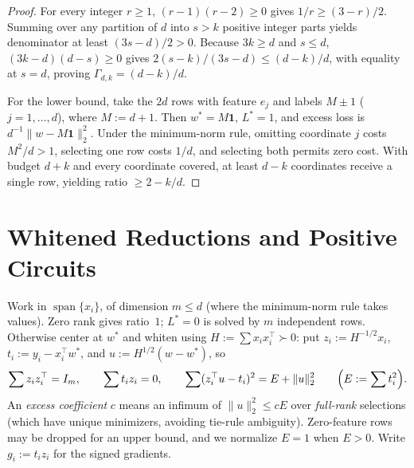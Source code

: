 \documentclass[11pt]{article}
\theoremstyle{plain}
\theoremstyle{definition}
\theoremstyle{remark}
\DeclareMathOperator{\spn}{span}
\begin{document}
\begin{proof}
For every integer $r \ge 1$, $(r - 1)(r - 2) \ge 0$ gives $1/r \ge (3 - r)/2$.
Summing over any partition of $d$ into $s > k$ positive integer parts yields denominator at least $(3s - d)/2 > 0$.
Because $3k \ge d$ and $s \le d$, $(3k - d)(d - s) \ge 0$ gives $2(s - k)/(3s - d) \le (d - k)/d$, with equality at $s = d$, proving $\Gamma_{d, k} = (d - k)/d$.

For the lower bound, take the $2d$ rows with feature $e_j$ and labels $M \pm 1$ ($j = 1, \dots, d$), where $M := d + 1$.
Then $w^* = M\mathbf{1}$, $L^* = 1$, and excess loss is $d^{-1}\|w - M\mathbf{1}\|_2^2$.
Under the minimum-norm rule, omitting coordinate $j$ costs $M^2/d > 1$, selecting one row costs $1/d$, and selecting both permits zero cost.
With budget $d + k$ and every coordinate covered, at least $d - k$ coordinates receive a single row, yielding ratio $\ge 2 - k/d$.
\end{proof}

\section{Whitened Reductions and Positive Circuits}

Work in $\spn\{x_i\}$, of dimension $m \le d$ (where the minimum-norm rule takes values).
Zero rank gives ratio~$1$; $L^* = 0$ is solved by $m$ independent rows.
Otherwise center at $w^*$ and whiten using $H := \sum x_i x_i^\top \succ 0$: put $z_i := H^{-1/2} x_i$, $t_i := y_i - x_i^\top w^*$, and $u := H^{1/2}(w - w^*)$, so
\[
\sum z_i z_i^\top = I_m, \qquad \sum t_i z_i = 0, \qquad
\sum (z_i^\top u - t_i)^2 = E + \|u\|_2^2 \qquad \Bigl(E := \sum t_i^2\Bigr).
\]
An \emph{excess coefficient} $c$ means an infimum of $\|u\|_2^2 \le c E$ over \emph{full-rank} selections (which have unique minimizers, avoiding tie-rule ambiguity).
Zero-feature rows may be dropped for an upper bound, and we normalize $E = 1$ when $E > 0$.
Write $g_i := t_i z_i$ for the signed gradients.
\end{document}
